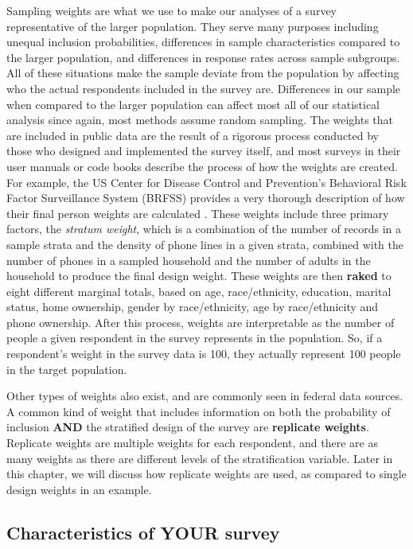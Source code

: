 \documentclass[
]{article}
\begin{document}
Sampling weights are what we use to make our analyses of a survey representative of the larger population. They serve many purposes including unequal inclusion probabilities, differences in sample characteristics compared to the larger population, and differences in response rates across sample subgroups. All of these situations make the sample deviate from the population by affecting who the actual respondents included in the survey are. Differences in our sample when compared to the larger population can affect most all of our statistical analysis since again, most methods assume random sampling. The weights that are included in public data are the result of a rigorous process conducted by those who designed and implemented the survey itself, and most surveys in their user manuals or code books describe the process of how the weights are created. For example, the US Center for Disease Control and Prevention's Behavioral Risk Factor Surveillance System (BRFSS) provides a very thorough description of how their final person weights are calculated \citep{cdc2020}. These weights include three primary factors, the \emph{stratum weight}, which is a combination of the number of records in a sample strata and the density of phone lines in a given strata, combined with the number of phones in a sampled household and the number of adults in the household to produce the final design weight. These weights are then \textbf{raked} to eight different marginal totals, based on age, race/ethnicity, education, marital status, home ownership, gender by race/ethnicity, age by race/ethnicity and phone ownership\citep{cdc2020}. After this process, weights are interpretable as the number of people a given respondent in the survey represents in the population. So, if a respondent's weight in the survey data is 100, they actually represent 100 people in the target population.

Other types of weights also exist, and are commonly seen in federal data sources. A common kind of weight that includes information on both the probability of inclusion \textbf{AND} the stratified design of the survey are \textbf{replicate weights}. Replicate weights are multiple weights for each respondent, and there are as many weights as there are different levels of the stratification variable. Later in this chapter, we will discuss how replicate weights are used, as compared to single design weights in an example.

\hypertarget{characteristics-of-your-survey}{%
\subsection{Characteristics of YOUR survey}\label{characteristics-of-your-survey}}
\end{document}
